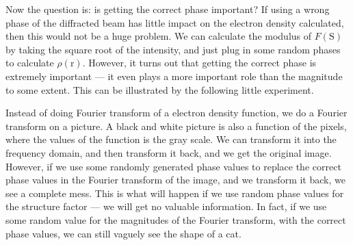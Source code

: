 \documentclass{article}
\theoremstyle{plain}\theoremheaderfont{\normalfont\itshape}\theorembodyfont{\rmfamily}\theoremseparator{.}\newtheorem*{rem}{Remark}\newtheorem*{ex}{Example}\newtheorem*{proof}{Proof}\newtheorem*{altp}{Alternative proof}
\theoremstyle{plain}\theoremheaderfont{\normalfont\bfseries}\theorembodyfont{\rmfamily}\theoremseparator{.}\newtheorem{thm}{Theorem}[section]\newtheorem{lem}[thm]{Lemma}\newtheorem{prop}[thm]{Proposition}\newtheorem*{cor}{Corollary}\newtheorem{defn}[thm]{Definition}\newtheorem{clm}[thm]{Claim}\newtheorem{clminproof}{Claim}\newtheorem*{law}{Law}\newtheorem{pos}[thm]{Postulate}
\theoremstyle{break}\theoremheaderfont{\normalfont\itshape}\theorembodyfont{\rmfamily}\theoremseparator{.\medskip}\newtheorem*{proofskip}{Proof}\newtheorem*{exs}{Examples}\newtheorem*{rems}{Remarks}
\theoremstyle{break}\theoremheaderfont{\normalfont\bfseries}\theorembodyfont{\rmfamily}\theoremseparator{.\medskip}\newtheorem{lemskip}[thm]{Lemma}\newtheorem{defnskip}[thm]{Definition}\newtheorem{propskip}[thm]{Proposition}\newtheorem{thmskip}[thm]{Theorem}
\numberwithin{equation}{section}
\newcommand{\vb}[1]{\bm{\mathrm{#1}}}
\begin{document}
    Now the question is: is getting the correct phase important? If using a wrong phase of the diffracted beam has little impact on the electron density calculated, then this would not be a huge problem. We can calculate the modulus of \(F(\vb{S})\) by taking the square root of the intensity, and just plug in some random phases to calculate \(\rho(\vb{r})\). However, it turns out that getting the correct phase is extremely important --- it even plays a more important role than the magnitude to some extent. This can be illustrated by the following little experiment.

    Instead of doing Fourier transform of a electron density function, we do a Fourier transform on a picture. A black and white picture is also a function of the pixels, where the values of the function is the gray scale. We can transform it into the frequency domain, and then transform it back, and we get the original image. However, if we use some randomly generated phase values to replace the correct phase values in the Fourier transform of the image, and we transform it back, we see a complete mess. This is what will happen if we use random phase values for the structure factor --- we will get no valuable information. In fact, if we use some random value for the magnitudes of the Fourier transform, with the correct phase values, we can still vaguely see the shape of a cat.
\end{document}

